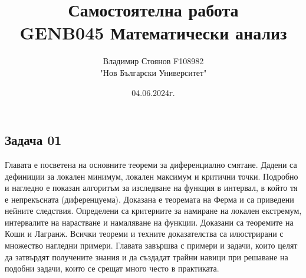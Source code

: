\documentclass{article}
\title{\huge Самостоятелна работа \\ GENB045 Математически анализ}
\author{\LARGE Владимир Стоянов F108982 \\ \LARGE "Нов Български Университет"}
\date{\LARGE 04.06.2024г.}
\begin{document}
\maketitle

\Large
\begin{center}
    \section*{Задача 01}
\end{center}
\newpage
Главата е посветена на основните теореми за диференциално смятане. Дадени са дефиниции за локален минимум, локален максимум и критични точки. Подробно и нагледно е показан алгоритъм за изследване на функция в интервал, в който тя е непрекъсната (диференцуема). Доказана е теоремата на Ферма и са приведени нейните следствия. Определени са критериите за намиране на локален екстремум, интервалите на нарастване и намаляване на функции. Доказани са теоремите на Коши и Лагранж. Всички теореми и техните доказателства са илюстрирани с множество нагледни примери. Главата завършва с примери и задачи, които целят да затвърдят получените знания и да създадат трайни навици при решаване на подобни задачи, които се срещат много често в практиката.
\end{document}
